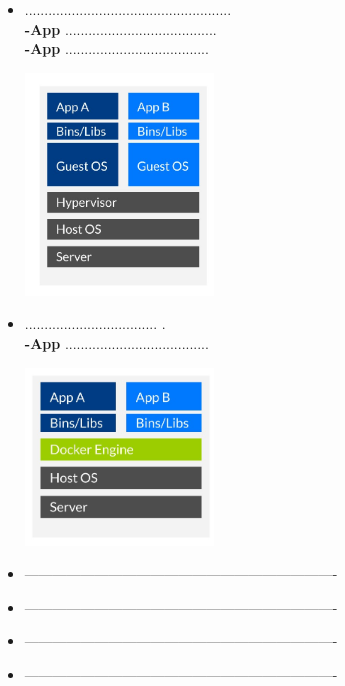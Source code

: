 \documentclass[twoside,twocolumn]{article}
\begin{document}
\begin{itemize}
	\item .....................................................
	\\ \textbf{-App} .......................................
	\\ \textbf{-App} .....................................
	\begin{center}
	\includegraphics[width=5cm]{./Imagenes/jerarquia1} 
	\end{center}
\end{itemize} 

\begin{itemize}
	\item ..................................
.
	\\ \textbf{-App} .....................................
	\begin{center}
	\includegraphics[width=5cm]{./Imagenes/jerarquia2} 
	\end{center}
\end{itemize} 

\begin{itemize}
	\item -------------------------------------------------------------------
		\item -------------------------------------------------------------------
			\item -------------------------------------------------------------------
	\item -------------------------------------------------------------------



\end{itemize} 
\end{document}

